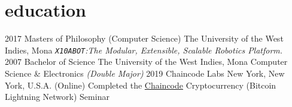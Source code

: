 \documentclass[]{friggeri-cv} %
\begin{document}
 \newpage

\section{education}

\begin{entrylist}
\entry
{2017}
{Masters {\normalfont of Philosophy (Computer Science)}}
{The University of the West Indies, Mona}
{\emph{\texttt{X10ABOT}:The Modular, Extensible, Scalable Robotics Platform.}} \\
\entry
{2007}
{Bachelor {\normalfont of Science}}
{The University of the West Indies, Mona}
{Computer Science \& Electronics \emph{(Double Major)}}
\entry
{2019}
{Chaincode Labs}
{New York, New York, U.S.A. (Online)}
{Completed the \href {https://learning.chaincode.com}{Chaincode} Cryptocurrency (Bitcoin Lightning Network) Seminar}

\end{entrylist}

\end{document}
